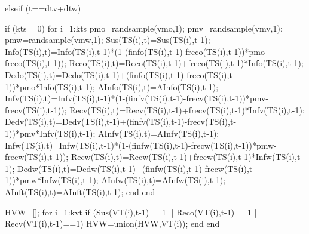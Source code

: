                           elseif (t==dtv+dtw)
                               
                                  if (kts~=0)
                                      for i=1:kts 
                                            pmo=randsample(vmo,1);
                                            pmv=randsample(vmv,1);
                                            pmw=randsample(vmw,1);
                                            Sus(TS(i),t)=Sus(TS(i),t-1);
                                            Info(TS(i),t)=Info(TS(i),t-1)*(1-(finfo(TS(i),t-1)-freco(TS(i),t-1))*pmo-freco(TS(i),t-1));
                                            Reco(TS(i),t)=Reco(TS(i),t-1)+freco(TS(i),t-1)*Info(TS(i),t-1);
                                            Dedo(TS(i),t)=Dedo(TS(i),t-1)+(finfo(TS(i),t-1)-freco(TS(i),t-1))*pmo*Info(TS(i),t-1);
                                            AInfo(TS(i),t)=AInfo(TS(i),t-1);
                                            Infv(TS(i),t)=Infv(TS(i),t-1)*(1-(finfv(TS(i),t-1)-frecv(TS(i),t-1))*pmv-frecv(TS(i),t-1));
                                            Recv(TS(i),t)=Recv(TS(i),t-1)+frecv(TS(i),t-1)*Infv(TS(i),t-1);
                                            Dedv(TS(i),t)=Dedv(TS(i),t-1)+(finfv(TS(i),t-1)-frecv(TS(i),t-1))*pmv*Infv(TS(i),t-1);
                                            AInfv(TS(i),t)=AInfv(TS(i),t-1); 
                                            Infw(TS(i),t)=Infw(TS(i),t-1)*(1-(finfw(TS(i),t-1)-frecw(TS(i),t-1))*pmw-frecw(TS(i),t-1));
                                            Recw(TS(i),t)=Recw(TS(i),t-1)+frecw(TS(i),t-1)*Infw(TS(i),t-1);
                                            Dedw(TS(i),t)=Dedw(TS(i),t-1)+(finfw(TS(i),t-1)-frecw(TS(i),t-1))*pmw*Infw(TS(i),t-1);
                                            AInfw(TS(i),t)=AInfw(TS(i),t-1);  
                                            AInft(TS(i),t)=AInft(TS(i),t-1);                     
                                      end
                                  end 
                               
                               HVW=[];
                               for i=1:kvt
                                    if (Sus(VT(i),t-1)==1 || Reco(VT(i),t-1)==1 || Recv(VT(i),t-1)==1)
                                          HVW=union(HVW,VT(i));                                    
                                    end
                               end
                               
